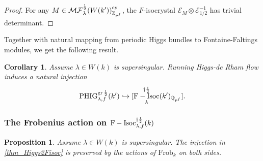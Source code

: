 \documentclass[12pt,twoside]{book}
\theoremstyle{plain}
\newtheorem{proposition}[proposition]{Proposition}
\newtheorem{corollary}[corollary]{Corollary}
\theoremstyle{definition}
\theoremstyle{remark}
\newcommand{\bQ}{{\mathbb Q}}
\newcommand{\bZ}{{\mathbb Z}}
\newcommand{\mE}{{\mathcal E}}
\newcommand{\MF}{\mathcal{MF}}
\DeclareMathOperator{\FIsoc}{F-Isoc}
\numberwithin{equation}{section}
\def\FIsoch{{\FIsoc^{\dagger{1\over 2}}_{\lambda} }}
\def\FIsochf{{\FIsoc^{\dagger{1\over 2}}_{\lambda,f} }}
\def\MFh{\MF^{{1\over 2}}_{\lambda}}
\def\PHighf{{\mathrm{PHIG}^{{\rm gr}\,{1\over 2}}_{\lambda,f}}}
\def\Frob{\mathrm{Frob}}
\begin{document}
\begin{proof}
For any $M\in \MFh(W(k'))_{\bZ_{p^f}}^{\rm cy}$, the $F$-isocrystal $\mE_M\otimes \mE_{1/2}^{-1}$ has trivial determinant.
\end{proof}

Together with natural mapping from periodic Higgs bundles to Fontaine-Faltings modules, we get the following result.
\begin{corollary} \label{thm_PHIG_k_to_F_Isoc_k}
Assume $\lambda\in W(k)$ is supersingular. Running Higgs-de Rham flow induces a natural injection
\begin{equation} \label{thm_Higgs2Fisoc}
\PHighf(k') \hookrightarrow [\FIsoch(k')_{\bQ_{p^f}}].
\end{equation}
\end{corollary}

\subsubsection{The Frobenius action on $\FIsochf(k)$}

\begin{proposition} \label{mthm_Higgs2FIsoc_Frob_Preserved}
Assume $\lambda\in W(k)$ is supersingular.
The injection in \eqref{thm_Higgs2Fisoc} is preserved by the actions of $\Frob_k$ on both sides.
\end{proposition}
\end{document}
